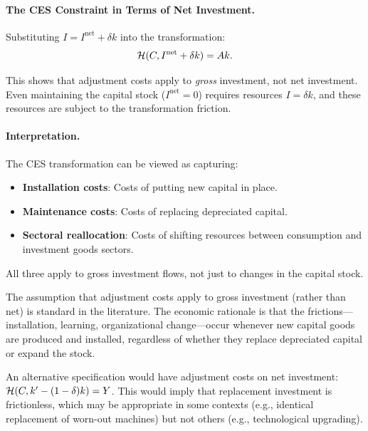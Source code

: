 \paragraph{The CES Constraint in Terms of Net Investment.}
Substituting $I = I^{\text{net}} + \delta k$ into the transformation:
\begin{equation}
\mathcal{H}(C, I^{\text{net}} + \delta k) = A k.
\label{eq:ac-dep-ces-net}
\end{equation}

This shows that adjustment costs apply to \emph{gross} investment, not net investment. Even maintaining the capital stock ($I^{\text{net}} = 0$) requires resources $I = \delta k$, and these resources are subject to the transformation friction.

\paragraph{Interpretation.}
The CES transformation can be viewed as capturing:
\begin{itemize}[nosep]
\item \textbf{Installation costs}: Costs of putting new capital in place.
\item \textbf{Maintenance costs}: Costs of replacing depreciated capital.
\item \textbf{Sectoral reallocation}: Costs of shifting resources between consumption and investment goods sectors.
\end{itemize}

All three apply to gross investment flows, not just to changes in the capital stock.

\begin{calloutnote}
The assumption that adjustment costs apply to gross investment (rather than net) is standard in the literature. The economic rationale is that the frictions---installation, learning, organizational change---occur whenever new capital goods are produced and installed, regardless of whether they replace depreciated capital or expand the stock.

An alternative specification would have adjustment costs on net investment: $\mathcal{H}(C, k' - (1-\delta)k) = Y$. This would imply that replacement investment is frictionless, which may be appropriate in some contexts (e.g., identical replacement of worn-out machines) but not others (e.g., technological upgrading).
\end{calloutnote}

